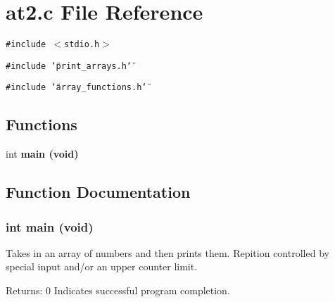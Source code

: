 \section{at2.c File Reference}
\label{at2_8c}
{\tt \#include $<$stdio.h$>$}\par
{\tt \#include \char`\"{}print\_\-arrays.h\char`\"{}}\par
{\tt \#include \char`\"{}array\_\-functions.h\char`\"{}}\par
\subsection*{Functions}
\begin{CompactItemize}
\item 
int \bf{main} (void)
\end{CompactItemize}


\subsection{Function Documentation}
\subsubsection{\setlength{\rightskip}{0pt plus 5cm}int main (void)}\label{at2_8c_5ad1c26f00c2399d3a5c7850100212d0}


Takes in an array of numbers and then prints them. Repition controlled by special input and/or an upper counter limit. \begin{Desc}
\item[Returns:]0 Indicates successful program completion. \end{Desc}
